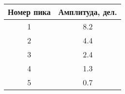 \begin{tabular}{|c|c|}
\hline
Номер пика & Амплитуда, дел. \\ \hline
1 & 8.2 \\ \hline
2 & 4.4 \\ \hline
3 & 2.4 \\ \hline
4 & 1.3 \\ \hline
5 & 0.7 \\ \hline
\end{tabular}
